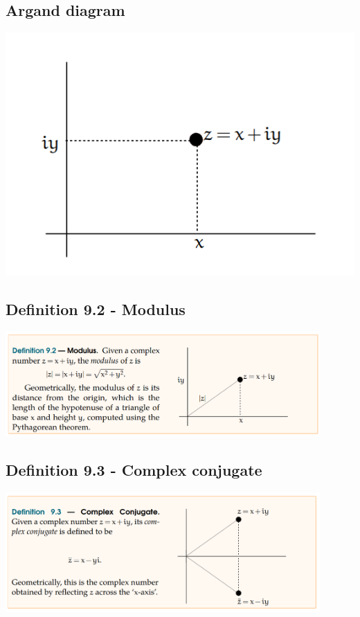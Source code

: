 \documentclass{article}
\theoremstyle{definition}
\theoremstyle{definition}
\theoremstyle{remark}
\begin{document}
\subsection{Argand diagram}
\begin{center}
    \centering\includegraphics[scale = 0.6]{Graph 9.0}\\
\end{center}



\subsection{Definition 9.2 - Modulus}
\begin{center}
    \includegraphics[width=0.9\textwidth]{Definition 9.2}\\
\end{center}


\subsection{Definition 9.3 - Complex conjugate}
\begin{center}
    \includegraphics[width=0.9\textwidth]{Definition 9.3}\\
\end{center}
\end{document}
